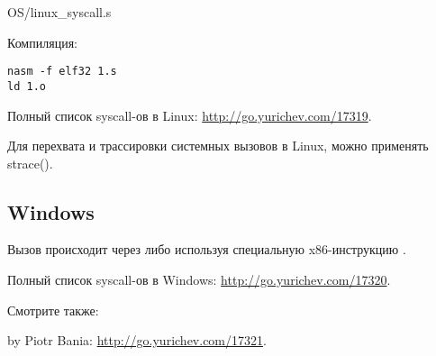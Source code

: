 
{OS/linux_syscall.s}

Компиляция:

\begin{lstlisting}
nasm -f elf32 1.s
ld 1.o
\end{lstlisting}

Полный список syscall-ов в Linux: \url{http://go.yurichev.com/17319}.

Для перехвата и трассировки системных вызовов в Linux, можно применять strace().

\subsection{Windows}


Вызов происходит через  
либо используя специальную x86-инструкцию .

Полный список syscall-ов в Windows: \url{http://go.yurichev.com/17320}.

Смотрите также:

 by Piotr Bania: \url{http://go.yurichev.com/17321}.

